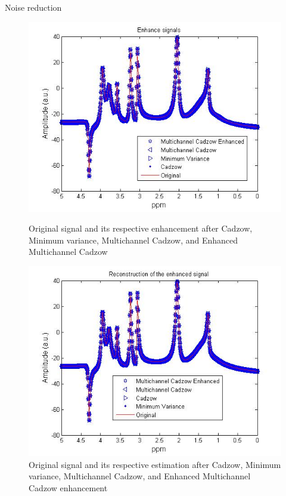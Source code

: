 \documentclass[t,12pt,english
\ifx\beamermode\undefined\else,\beamermode\fi
]{beamer}
\begin{document}
\begin{frame}{Noise reduction}
   
\begin{figure}[!htbp]
%
\centering
\includegraphics[width=1\textwidth]{27.jpg}
\caption{\tiny Original signal and its respective enhancement after Cadzow, Minimum variance, Multichannel Cadzow, and Enhanced Multichannel Cadzow}
\endminipage\hfill
{}%
\centering
\includegraphics[width=1\textwidth]{28.jpg}
\caption{\tiny Original signal and its respective estimation after Cadzow, Minimum variance, Multichannel Cadzow, and Enhanced Multichannel Cadzow enhancement}
\endminipage\hfill
\end{figure}

\end{frame}
\end{document}
